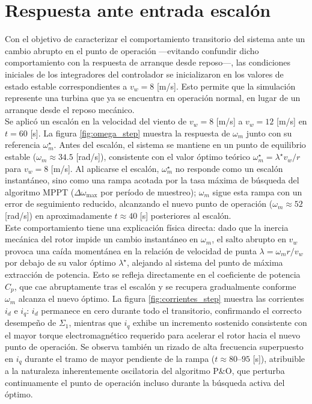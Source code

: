 \section{Respuesta ante entrada escalón}

Con el objetivo de caracterizar el comportamiento transitorio del sistema
ante un cambio abrupto en el punto de operación —evitando confundir dicho
comportamiento con la respuesta de arranque desde reposo—, las condiciones
iniciales de los integradores del controlador se inicializaron en los
valores de estado estable correspondientes a $v_w = 8$ [m/s]. Esto permite
que la simulación represente una turbina que ya se encuentra en operación
normal, en lugar de un arranque desde el reposo mecánico.
\\

Se aplicó un escalón en la velocidad del viento de $v_w = 8$ [m/s] a
$v_w = 12$ [m/s] en $t = 60$ [s]. La figura \ref{fig:omega_step} muestra la
respuesta de $\omega_m$ junto con su referencia $\omega_m^\star$. Antes
del escalón, el sistema se mantiene en un punto de equilibrio estable
($\omega_m \approx 34.5$ [rad/s]), consistente con el valor óptimo teórico
$\omega_m^\star = \lambda^\star v_w / r$ para $v_w = 8$ [m/s]. Al aplicarse
el escalón, $\omega_m^\star$ no responde como un escalón instantáneo,
sino como una rampa acotada por la tasa máxima de búsqueda del algoritmo
MPPT ($\Delta\omega_{\max}$ por período de muestreo); $\omega_m$ sigue
esta rampa con un error de seguimiento reducido, alcanzando el nuevo
punto de operación ($\omega_m \approx 52$ [rad/s]) en aproximadamente
$t \approx 40$ [s] posteriores al escalón.
\\

Este comportamiento tiene una explicación física directa: dado que la
inercia mecánica del rotor impide un cambio instantáneo en $\omega_m$, el
salto abrupto en $v_w$ provoca una caída momentánea en la relación de
velocidad de punta $\lambda = \omega_m r / v_w$ por debajo de su valor
óptimo $\lambda^\star$, alejando al sistema del punto de máxima
extracción de potencia. Esto se refleja directamente en el coeficiente de
potencia $C_p$, que cae abruptamente tras el escalón y se recupera
gradualmente conforme $\omega_m$ alcanza el nuevo óptimo. La figura
\ref{fig:corrientes_step} muestra las corrientes $i_d$ e $i_q$: $i_d$
permanece en cero durante todo el transitorio, confirmando el correcto
desempeño de $\Sigma_1$, mientras que $i_q$ exhibe un incremento
sostenido consistente con el mayor torque electromagnético requerido para
acelerar el rotor hacia el nuevo punto de operación. Se observa también
un rizado de alta frecuencia superpuesto en $i_q$ durante el tramo de
mayor pendiente de la rampa ($t \approx 80$--$95$ [s]), atribuible a la
naturaleza inherentemente oscilatoria del algoritmo P\&O, que perturba
continuamente el punto de operación incluso durante la búsqueda activa
del óptimo.

